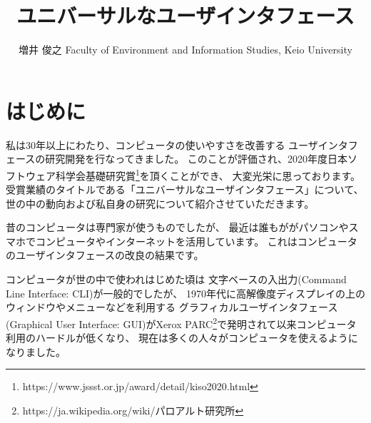 \documentclass[topics]{compsoft} %
\begin{document}
\title{ユニバーサルなユーザインタフェース}

%
\author{増井 俊之
%
%
%
%
%
{Faculty of Environment and Information Studies, Keio University}
%
\shutten
%
%
}

%

\maketitle

\section{はじめに}

私は30年以上にわたり、コンピュータの使いやすさを改善する
ユーザインタフェースの研究開発を行なってきました。
このことが評価され、2020年度日本ソフトウェア科学会基礎研究賞\footnote{
  \textsf{https:{\slash}{\slash}www.jssst.or.jp{\slash}award{\slash}detail{\slash}kiso2020.html}
}を頂くことができ、
大変光栄に思っております。
受賞業績のタイトルである「ユニバーサルなユーザインタフェース」について、
世の中の動向および私自身の研究について紹介させていただきます。

昔のコンピュータは専門家が使うものでしたが、
最近は誰もががパソコンやスマホでコンピュータやインターネットを活用しています。
これはコンピュータのユーザインタフェースの改良の結果です。

コンピュータが世の中で使われはじめた頃は
文字ベースの入出力(Command Line Interface: CLI)が一般的でしたが、
1970年代に高解像度ディスプレイの上の
ウィンドウやメニューなどを利用する
グラフィカルユーザインタフェース(Graphical User Interface: GUI)がXerox PARC\footnote{
  \textsf{https:{\slash}{\slash}ja.wikipedia.org{\slash}wiki{\slash}パロアルト研究所}
}で発明されて以来コンピュータ利用のハードルが低くなり、
現在は多くの人々がコンピュータを使えるようになりました。
\end{document}
